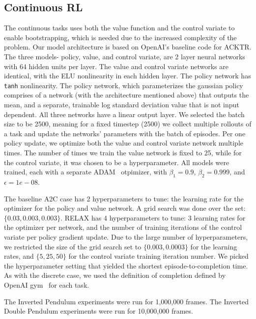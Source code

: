 \documentclass{article}
\newcommand{\RELAX}{{\textnormal{RELAX}}}
\begin{document}
\subsection{Continuous RL}
The continuous tasks uses both the value function and the control variate to enable bootstrapping, which is needed due to the increased complexity of the problem. Our model architecture is based on OpenAI's baseline\citep{?} code for ACKTR\citep{?}.
The three models- policy, value, and control variate, are 2 layer neural networks with 64 hidden units per layer.
The value and control variate networks are identical, with the ELU nonlinearity in each hidden layer.
The policy network has \texttt{tanh} nonlinearity.
The policy network, which parameterizes the gaussian policy comprises of a network (with the architecture mentioned above) that outputs the mean, and a separate, trainable log standard deviation value that is not input dependent.
All three networks have a linear output layer.
We selected the batch size to be 2500, meaning for a fixed timestep (2500) we collect multiple rollouts of a task and update the networks' parameters with the batch of episodes.
Per one policy update, we optimize both the value and control variate network multiple times.
The number of times we train  the value network is fixed to 25, while for the control variate, it was chosen to be a hyperparameter. 
All models were trained, each with a separate ADAM~\citep{kingma2015adam} otpimizer, with $\beta_1=0.9$, $\beta_2=0.999$, and $\epsilon=1e-08$. 

The baseline A2C case has 2 hyperparameters to tune: the learning rate for the optimizer for the policy and value network.
A grid search was done over the set: $\{0.03, 0.003, 0.003\}$.
\RELAX{} has 4 hyperparameters to tune: 3 learning rates for the optimizer per network, and the number of training iterations of the control variate per policy gradient update.
Due to the large number of hyperparameters, we restricted the size of the grid search set to $\{0.003, 0.0003\}$ for the learning rates, and $\{5, 25, 50\}$ for the control variate training iteration number.
We picked the hyperparameter setting that yielded the shortest episode-to-completion time.
As with the discrete case, we used the definition of completion defined by OpenAI gym~\citep{1606.01540} for each task. 

The Inverted Pendulum experiments were run for 1,000,000 frames.
The Inverted Double Pendulum experiments were run for 10,000,000 frames.
\end{document}
